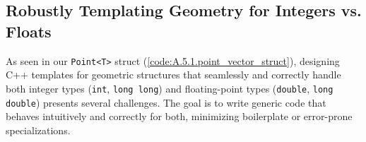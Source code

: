 \subsection{Robustly Templating Geometry for Integers vs. Floats}
\label{ssec:A.7.1}

\begin{openquestion}
\label{oq:A.7.1.template_consistency}
As seen in our \texttt{Point<T>} struct (\cref{code:A.5.1.point_vector_struct}), designing C++ templates for geometric structures that seamlessly and correctly handle both integer types (\texttt{int}, \texttt{long long}) and floating-point types (\texttt{double}, \texttt{long double}) presents several challenges. The goal is to write generic code that behaves intuitively and correctly for both, minimizing boilerplate or error-prone specializations.


\end{openquestion}
